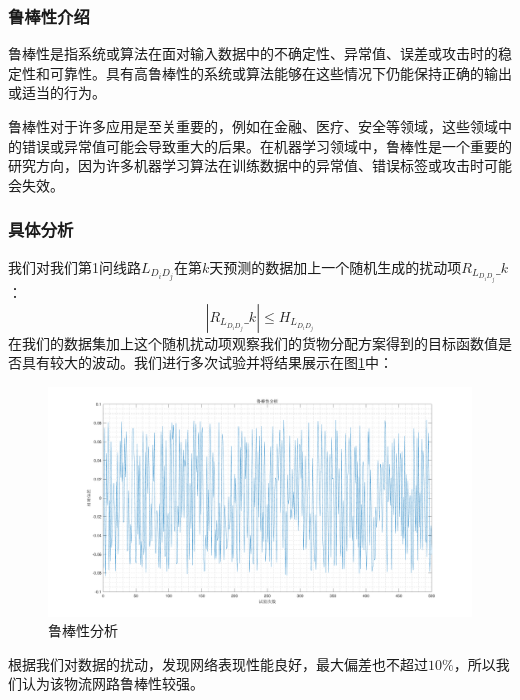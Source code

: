 \documentclass{MathorCupmodeling}
\begin{document}
\subsubsection{鲁棒性介绍}
鲁棒性是指系统或算法在面对输入数据中的不确定性、异常值、误差或攻击时的稳定性和可靠性。具有高鲁棒性的系统或算法能够在这些情况下仍能保持正确的输出或适当的行为。

鲁棒性对于许多应用是至关重要的，例如在金融、医疗、安全等领域，这些领域中的错误或异常值可能会导致重大的后果。在机器学习领域中，鲁棒性是一个重要的研究方向，因为许多机器学习算法在训练数据中的异常值、错误标签或攻击时可能会失效。
\subsubsection{具体分析}
我们对我们第1问线路$L_{D_iD_j}$在第$k$天预测的数据加上一个随机生成的扰动项$R_{L_{D_iD_j}}\_k$：
\begin{equation}
	|R_{L_{D_iD_j}}\_k|\le H_{L_{D_iD_j}}
\end{equation}
在我们的数据集加上这个随机扰动项观察我们的货物分配方案得到的目标函数值是否具有较大的波动。我们进行多次试验并将结果展示在图\ref{lbx}中：
\begin{figure}[h]
		\centering
		\includegraphics[width=\textwidth]{figure/5.pdf}
		\caption{鲁棒性分析}\label{lbx}
	\end{figure}

根据我们对数据的扰动，发现网络表现性能良好，最大偏差也不超过$10\%$，所以我们认为该物流网路鲁棒性较强。
	\newpage
\end{document}
